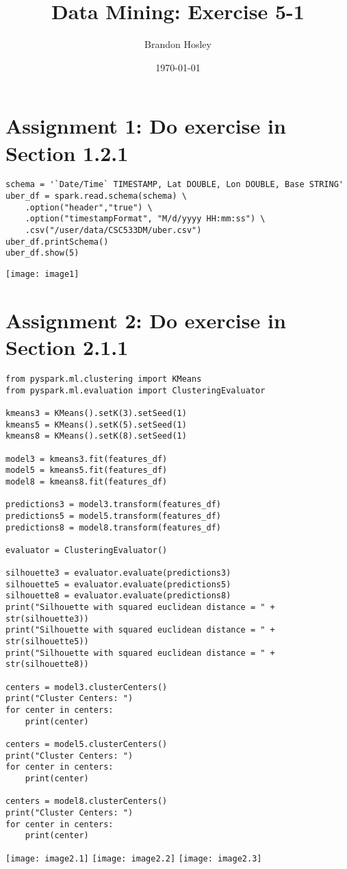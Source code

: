 \documentclass[]{article}
\title{Data Mining: Exercise 5-1}
\author{Brandon Hosley}
\date{\today}
\begin{document}
\maketitle

\section*{Assignment 1: Do exercise in Section 1.2.1}

\begin{verbatim}
schema = '`Date/Time` TIMESTAMP, Lat DOUBLE, Lon DOUBLE, Base STRING'
uber_df = spark.read.schema(schema) \
	.option("header","true") \
	.option("timestampFormat", "M/d/yyyy HH:mm:ss") \
	.csv("/user/data/CSC533DM/uber.csv")
uber_df.printSchema()
uber_df.show(5)
\end{verbatim}
\texttt{[image: image1]}

\section*{Assignment 2: Do exercise in Section 2.1.1}

\begin{verbatim}
from pyspark.ml.clustering import KMeans
from pyspark.ml.evaluation import ClusteringEvaluator

kmeans3 = KMeans().setK(3).setSeed(1)
kmeans5 = KMeans().setK(5).setSeed(1)
kmeans8 = KMeans().setK(8).setSeed(1)

model3 = kmeans3.fit(features_df)
model5 = kmeans5.fit(features_df)
model8 = kmeans8.fit(features_df)

predictions3 = model3.transform(features_df)
predictions5 = model5.transform(features_df)
predictions8 = model8.transform(features_df)

evaluator = ClusteringEvaluator()

silhouette3 = evaluator.evaluate(predictions3)
silhouette5 = evaluator.evaluate(predictions5)
silhouette8 = evaluator.evaluate(predictions8)
print("Silhouette with squared euclidean distance = " + str(silhouette3))
print("Silhouette with squared euclidean distance = " + str(silhouette5))
print("Silhouette with squared euclidean distance = " + str(silhouette8))

centers = model3.clusterCenters()
print("Cluster Centers: ")
for center in centers:
	print(center)

centers = model5.clusterCenters()
print("Cluster Centers: ")
for center in centers:
	print(center)

centers = model8.clusterCenters()
print("Cluster Centers: ")
for center in centers:
	print(center)

\end{verbatim}
\texttt{[image: image2.1]}
\texttt{[image: image2.2]}
\texttt{[image: image2.3]}
\end{document}
